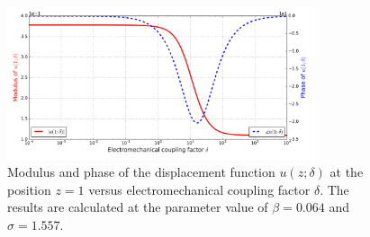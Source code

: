 \documentclass{svjour3}                     %
\begin{document}
\begin{figure}[!htbp]
    \centering
    \includegraphics[width=0.8\textwidth]{./img_eig_asy/fig_sol_analytic_disp_end.jpg}
    \caption{Modulus and phase of the displacement function $u(z;\delta)$ at the position $z=1$ versus electromechanical coupling factor $\delta$. The results are calculated at the parameter value of $\beta = 0.064$ and $\sigma = 1.557$.}
    \label{fig:fig_sol_analytic_disp_end}
\end{figure}
\end{document}
